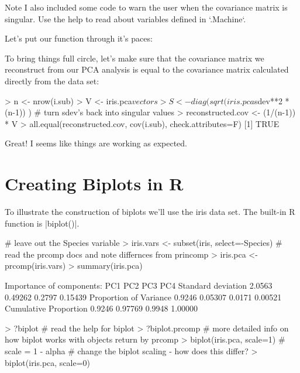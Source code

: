 Note I also included some code to warn the user when the covariance matrix is singular. Use the help to read about variables defined in `.Machine`.

Let's put our function through it's paces:
%

To bring things full circle, let's make sure that the covariance matrix we reconstruct from our PCA analysis is equal to the covariance matrix calculated directly from the data set:
\begin{R}
> n <- nrow(i.sub)
> V <- iris.pca$vectors
> S <- diag( sqrt(iris.pca$sdev**2 * (n-1)) ) # turn sdev's back into singular values
> reconstructed.cov <- (1/(n-1)) * V %
> all.equal(reconstructed.cov, cov(i.sub), check.attributes=F)
[1] TRUE
\end{R}
Great! I seems like things are working as expected.

\section{Creating Biplots in R}

To illustrate the construction of biplots we'll use the iris data set. The built-in R function is |biplot()|.

\begin{R}
# leave out the Species variable
> iris.vars <- subset(iris, select=-Species)
# read the prcomp docs and note differnces from princomp
> iris.pca <- prcomp(iris.vars)
> summary(iris.pca)

Importance of components:
                          PC1     PC2    PC3     PC4
Standard deviation     2.0563 0.49262 0.2797 0.15439
Proportion of Variance 0.9246 0.05307 0.0171 0.00521
Cumulative Proportion  0.9246 0.97769 0.9948 1.00000

> ?biplot  # read the help for biplot
> ?biplot.prcomp  # more detailed info on how biplot works with objects return by prcomp
> biplot(iris.pca, scale=1)  # scale = 1 - alpha
# change the biplot scaling - how does this differ?
> biplot(iris.pca, scale=0)
\end{R}

